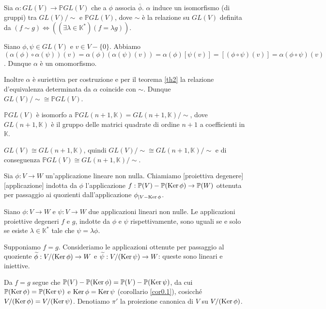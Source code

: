 \begin{Theorem}\label{th8}
	Sia $\alpha: GL(V) \rightarrow \mathbb{P}GL(V)$ che a $\phi$ associa $\bar{\phi}$. $\alpha$ induce un isomorfismo (di gruppi) tra $GL(V)/\sim$ e $\mathbb{P}GL(V)$, dove $\sim$ \`e la relazione su $GL(V)$ definita da $(f \sim g) \Leftrightarrow ((\exists \lambda \in \mathbb{K}^*)(f = \lambda g))$.
\end{Theorem}
\Proof Siano $\phi, \psi \in GL(V)$ e $v \in V - \lbrace 0 \rbrace$. Abbiamo $(\alpha(\phi) \circ \alpha(\psi))(v) = \alpha(\phi)(\alpha(\psi)(v)) = \alpha(\phi)[\psi(v)]= [(\phi \circ \psi)(v)] = \alpha(\phi \circ \psi)(v)$. Dunque $\alpha$ \`e un omomorfismo.
	\par Inoltre $\alpha$ \`e suriettiva per costruzione e per il teorema \ref{th2} la relazione d'equivalenza determinata da $\alpha$ coincide con $\sim$. Dunque $GL(V)/\sim \cong \mathbb{P}GL(V)$. \EndProof
\begin{Corollary}\label{cor1}
	$\mathbb{P}GL(V)$ \`e isomorfo a $\mathbb{P}GL(n + 1, \mathbb{K}) = GL(n+ 1, \mathbb{K})/\sim$, dove $GL(n + 1, \mathbb{K})$ \`e il gruppo delle matrici quadrate di ordine $n + 1$ a coefficienti in $\mathbb{K}$.
\end{Corollary}
\Proof $GL(V) \cong GL(n + 1, \mathbb{K})$, quindi $GL(V)/\sim \cong GL(n + 1, \mathbb{K})/\sim$ e di conseguenza $\mathbb{P}GL(V) \cong GL(n + 1, \mathbb{K})/\sim$. \EndProof
\begin{Definition}\label{def11}
	Sia $\phi: V \rightarrow W$ un'applicazione lineare non nulla. Chiamiamo [proiettiva degenere][applicazione] indotta da $\phi$ l'applicazione $f: \mathbb{P}(V) - \mathbb{P}(\operatorname{Ker} \phi) \rightarrow \mathbb{P}(W)$ ottenuta per passaggio ai quozienti dall'applicazione $\phi_{|V - \operatorname{Ker} \phi}$.
\end{Definition}
\begin{Theorem}\label{th9}
	Siano $\phi: V \rightarrow W$ e $\psi: V \rightarrow W$ due applicazioni lineari non nulle. Le applicazioni proiettive degeneri $f$ e $g$, indotte da $\phi$ e $\psi$ rispettivamente, sono uguali se e solo se esiste $\lambda \in \mathbb{K}^*$ tale che $\psi = \lambda \phi$.
\end{Theorem}
\Proof Supponiamo $f = g$. Consideriamo le applicazioni ottenute per passaggio al quoziente $\widetilde{\phi}: V/(\operatorname{Ker} \phi) \rightarrow W$ e $\widetilde{\psi}: V/(\operatorname{Ker} \psi) \rightarrow W$: queste sono lineari e iniettive.
	\par Da $f = g$ segue che $\mathbb{P}(V) - \mathbb{P}(\operatorname{Ker} \phi) = \mathbb{P}(V) - \mathbb{P}(\operatorname{Ker} \psi)$, da cui $\mathbb{P}(\operatorname{Ker} \phi) = \mathbb{P}(\operatorname{Ker} \psi)$ e $\operatorname{Ker} \phi = \operatorname{Ker} \psi$ (corollario \ref{cor0.1}), cosicch\'e $V/(\operatorname{Ker} \phi) = V/(\operatorname{Ker} \psi)$. Denotiamo $\pi'$ la proiezione canonica di $V$ su $V/(\operatorname{Ker} \phi)$.
